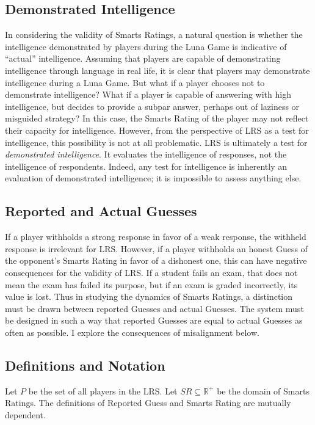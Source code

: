 \subsection{Demonstrated Intelligence}

In considering the validity of Smarts Ratings, a natural question is whether the intelligence demonstrated by players during the Luna Game is indicative of ``actual'' intelligence. Assuming that players are capable of demonstrating intelligence through language in real life, it is clear that players may demonstrate intelligence during a Luna Game. But what if a player chooses not to demonstrate intelligence? What if a player is capable of answering with high intelligence, but decides to provide a subpar answer, perhaps out of laziness or misguided strategy? In this case, the Smarts Rating of the player may not reflect their capacity for intelligence. However, from the perspective of LRS as a test for intelligence, this possibility is not at all problematic. LRS is ultimately a test for \textit{demonstrated intelligence}. It evaluates the intelligence of responses, not the intelligence of respondents. Indeed, any test for intelligence is inherently an evaluation of demonstrated intelligence; it is impossible to assess anything else. 

\subsection{Reported and Actual Guesses}

If a player withholds a strong response in favor of a weak response, the withheld response is irrelevant for LRS. However, if a player withholds an honest Guess of the opponent's Smarts Rating in favor of a dishonest one, this can have negative consequences for the validity of LRS. If a student fails an exam, that does not mean the exam has failed its purpose, but if an exam is graded incorrectly, its value is lost. Thus in studying the dynamics of Smarts Ratings, a distinction must be drawn between reported Guesses and actual Guesses. The system must be designed in such a way that reported Guesses are equal to actual Guesses as often as possible. I explore the consequences of misalignment below.


\subsection{Definitions and Notation}

Let $P$ be the set of all players in the LRS. Let $SR \subseteq \mathbb{R}^+$ be the domain of Smarts Ratings. The definitions of Reported Guess and Smarts Rating are mutually dependent.

